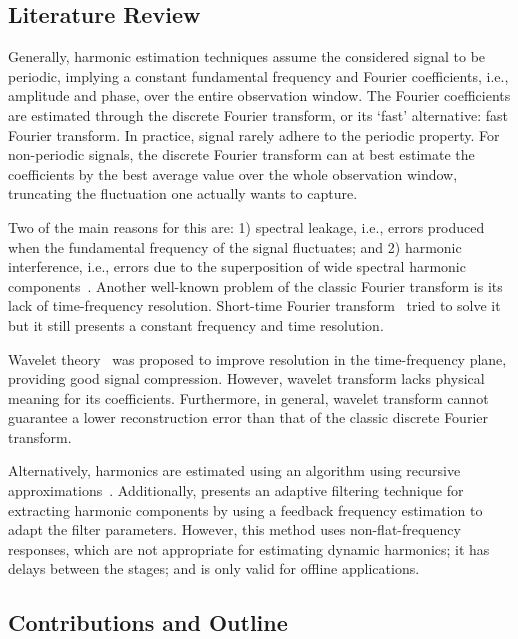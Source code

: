 \subsection{Literature Review}
\label{sec:literature_review}

Generally, harmonic estimation techniques assume the considered signal to be periodic, implying a constant fundamental frequency and Fourier coefficients, i.e., amplitude and phase, over the entire observation window. The Fourier coefficients are estimated through the discrete Fourier transform, or its `fast' alternative: fast Fourier transform. In practice, signal rarely adhere to the periodic property. For non-periodic signals, the discrete Fourier transform can at best estimate the coefficients by the best average value over the whole observation window, truncating the fluctuation one actually wants to capture.

Two of the main reasons for this are: 1) spectral leakage, i.e., errors produced when the fundamental frequency of the signal fluctuates; and 2) harmonic interference, i.e., errors due to the superposition of wide spectral harmonic components~\cite{liguori_2004}. Another well-known problem of the classic Fourier transform is its lack of time-frequency resolution. Short-time Fourier transform~\cite{gabor_1946,kiymika_2005} tried to solve it but it still presents a constant frequency and time resolution. 

Wavelet theory~\cite{daubechies_1992,vetterli_1995} was proposed to improve resolution in the time-frequency plane, providing good signal compression. However, wavelet transform lacks physical meaning for its coefficients. Furthermore, in general, wavelet transform cannot guarantee a lower reconstruction error than that of the classic discrete Fourier transform. 

Alternatively, harmonics are estimated using an algorithm using recursive approximations~\cite{yang_2005}. Additionally, \cite{tomic_2007} presents an adaptive filtering technique for extracting harmonic components by using a feedback frequency estimation to adapt the filter parameters. However, this method uses non-flat-frequency responses, which are not appropriate for estimating dynamic harmonics; it has delays between the stages; and is only valid for offline applications. 

\subsection{Contributions and Outline}
\label{sec:contributions_and_outline}

